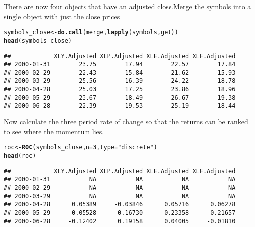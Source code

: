 \documentclass{article}\usepackage{graphicx, color}
\makeatletter
\newcommand{\hlfunctioncall}[1]{\textcolor[rgb]{0.501960784313725,0,0.329411764705882}{\textbf{#1}}}%
\newcommand{\hlstring}[1]{\textcolor[rgb]{0.6,0.6,1}{#1}}%
\newenvironment{kframe}{%
 \def\at@end@of@kframe{}%
 \ifinner\ifhmode%
  \def\at@end@of@kframe{\end{minipage}}%
  \begin{minipage}{\columnwidth}%
 \fi\fi%
 \def\FrameCommand##1{\hskip\@totalleftmargin \hskip-\fboxsep
 \colorbox{shadecolor}{##1}\hskip-\fboxsep
     \hskip-\linewidth \hskip-\@totalleftmargin \hskip\columnwidth}%
 \MakeFramed {\advance\hsize-\width
   \@totalleftmargin\z@ \linewidth\hsize
   \@setminipage}}%
 {\par\unskip\endMakeFramed%
 \at@end@of@kframe}
\newenvironment{knitrout}{}{} %
\makeatother
\begin{document}
There are now four objects that have an adjusted close.Merge the symbols into a single object with just the close prices
\begin{knitrout}
\color{fgcolor}\begin{kframe}
\begin{alltt}
symbols_close <- \hlfunctioncall{do.call}(merge, \hlfunctioncall{lapply}(symbols, get))
\hlfunctioncall{head}(symbols_close)
\end{alltt}
\begin{verbatim}
##            XLY.Adjusted XLP.Adjusted XLE.Adjusted XLF.Adjusted
## 2000-01-31        23.75        17.94        22.57        17.84
## 2000-02-29        22.43        15.84        21.62        15.93
## 2000-03-29        25.56        16.39        24.22        18.78
## 2000-04-28        25.03        17.25        23.86        18.96
## 2000-05-29        23.67        18.49        26.67        19.38
## 2000-06-28        22.39        19.53        25.19        18.44
\end{verbatim}
\end{kframe}
\end{knitrout}

Now calculate the three period rate of change so that the returns can be ranked to see where the momentum lies. 
\begin{knitrout}
\color{fgcolor}\begin{kframe}
\begin{alltt}
roc <- \hlfunctioncall{ROC}(symbols_close, n = 3, type = \hlstring{"discrete"})
\hlfunctioncall{head}(roc)
\end{alltt}
\begin{verbatim}
##            XLY.Adjusted XLP.Adjusted XLE.Adjusted XLF.Adjusted
## 2000-01-31           NA           NA           NA           NA
## 2000-02-29           NA           NA           NA           NA
## 2000-03-29           NA           NA           NA           NA
## 2000-04-28      0.05389     -0.03846      0.05716      0.06278
## 2000-05-29      0.05528      0.16730      0.23358      0.21657
## 2000-06-28     -0.12402      0.19158      0.04005     -0.01810
\end{verbatim}
\end{kframe}
\end{knitrout}
\end{document}
